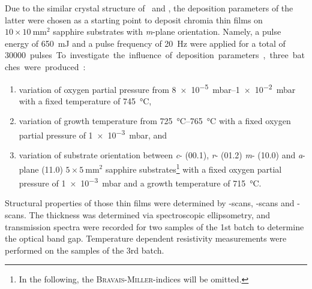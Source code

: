 Due to the similar crystal structure of \cro\ and \agao, the deposition parameters of the latter were chosen as a starting point to deposit chromia thin films on $10\times\qty{10}{\mm\squared}$ sapphire substrates with \textit{m}-plane orientation.
Namely, a pulse energy of \qty{650}{mJ} and a pulse frequency of \qty{20}{\Hz} were applied for a total of \qty{30000} pulses.
To investigate the influence of deposition parameters, three batches were produced:
\begin{enumerate}
    \item variation of oxygen partial pressure from \qtyrange{8e-5}{1e-2}{mbar} with a fixed temperature of \qty{745}{\degreeCelsius},
    \item variation of growth temperature from \qtyrange{725}{765}{\degreeCelsius} with a fixed oxygen partial pressure of \qty{1e-3}{mbar}, and
    \item variation of substrate orientation between \textit{c}- (00.1), \textit{r}- (01.2) \textit{m}- (10.0) and \textit{a}-plane (11.0) $5\times\qty{5}{\mm\squared}$ sapphire substrates\footnote{
        In the following, the \textsc{Bravais}-\textsc{Miller}-indices will be omitted.
        }
    with a fixed oxygen partial pressure of \qty{1e-3}{mbar} and a growth temperature of \qty{715}{\degreeCelsius}.
\end{enumerate}
Structural properties of those thin films were determined by \thetaomega-scans, \textomega-scans and \textphi-scans.
The thickness was determined via spectroscopic ellipsometry, and transmission spectra were recorded for two samples of the 1st batch to determine the optical band gap.
Temperature dependent resistivity measurements were performed on the samples of the 3rd batch.